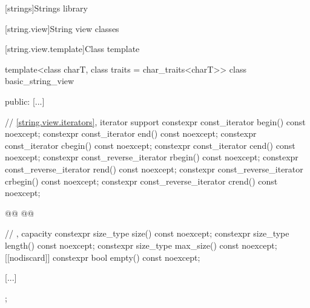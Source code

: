 
[strings]{Strings library}

\setcounter{section}{3}
[string.view]{String view classes}

\setcounter{subsection}{1}
[string.view.template]{Class template }

%
%
%
%
%
%
%
%
%
%
%
%
%
\begin{codeblock}
template<class charT, class traits = char_traits<charT>>
class basic_string_view {
public:
  [...]

  // \ref{string.view.iterators}, iterator support
  constexpr const_iterator begin() const noexcept;
  constexpr const_iterator end() const noexcept;
  constexpr const_iterator cbegin() const noexcept;
  constexpr const_iterator cend() const noexcept;
  constexpr const_reverse_iterator rbegin() const noexcept;
  constexpr const_reverse_iterator rend() const noexcept;
  constexpr const_reverse_iterator crbegin() const noexcept;
  constexpr const_reverse_iterator crend() const noexcept;

  @@
  @@

  // , capacity
  constexpr size_type size() const noexcept;
  constexpr size_type length() const noexcept;
  constexpr size_type max_size() const noexcept;
  [[nodiscard]] constexpr bool empty() const noexcept;

  [...]
};
\end{codeblock}


